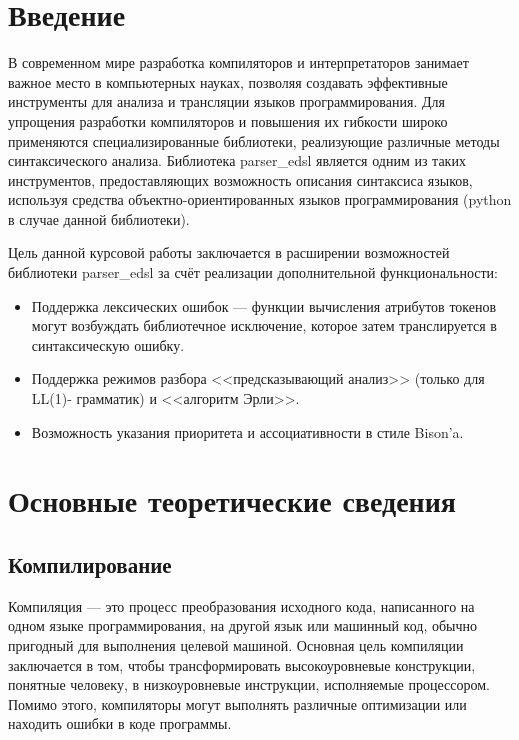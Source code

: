 \documentclass[14pt, russian]{scrartcl}
\newcommand{\anonsection}[1]{\cleardoublepage
\phantomsection
\addcontentsline{toc}{section}{\protect\numberline{}#1}
\section*{#1}\vspace*{2.5ex} %
}
\begin{document}

\setlength{\tabcolsep}{3pt}
\newpage
\setcounter{page}{2}

\newpage
\renewcommand\contentsname{\hfill{\normalfont{СОДЕРЖАНИЕ}}\hfill}  %
\tableofcontents
\newpage
\anonsection{Введение}  %

В современном мире разработка компиляторов и интерпретаторов занимает важное место в компьютерных науках, позволяя
создавать эффективные инструменты для анализа и трансляции языков программирования. Для упрощения разработки
компиляторов и повышения их
гибкости широко применяются специализированные библиотеки, реализующие различные методы синтаксического анализа.
Библиотека parser\_edsl является одним из таких инструментов, предоставляющих возможность описания синтаксиса
языков, используя средства объектно-ориентированных языков программирования (python в случае данной библиотеки).

Цель данной курсовой работы заключается в расширении возможностей библиотеки parser\_edsl
за счёт реализации дополнительной функциональности:

\begin{itemize}
	\item Поддержка лексических ошибок --- функции вычисления атрибутов токенов
	могут возбуждать библиотечное исключение, которое затем транслируется
	в синтаксическую ошибку.
	\item Поддержка режимов разбора <<предсказывающий анализ>> (только для LL(1)-
	грамматик) и <<алгоритм Эрли>>.
	\item Возможность указания приоритета и ассоциативности в стиле Bison'a.
\end{itemize}


\section{Основные теоретические сведения}

\subsection{Компилирование}

Компиляция — это процесс преобразования исходного кода, написанного на одном языке программирования,
на другой язык или машинный код,
обычно пригодный для выполнения целевой машиной\cite{conmocons}. Основная цель компиляции заключается в том, чтобы
трансформировать высокоуровневые конструкции, понятные человеку, в низкоуровневые инструкции, исполняемые
процессором. Помимо этого, компиляторы могут выполнять различные оптимизации или находить ошибки в коде программы.
\end{document}
